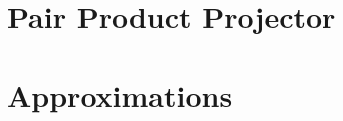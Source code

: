 \documentclass[aps,prl,reprint,groupedaddress]{revtex4-1}
\begin{document}
\section{Pair Product Projector}


\section{Approximations}

\subsection{}
\subsubsection{}


%


\end{document}

